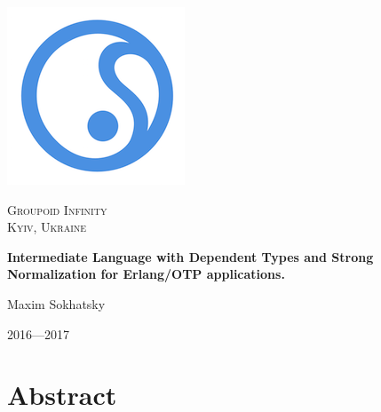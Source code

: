 \documentclass[11pt,oneside]{article}
\begin{document}
\thispagestyle{empty}
\begin{center}

\begin{minipage}[t]{2cm}
    \includegraphics[scale=0.4]{img/S}
\end{minipage}
\begin{minipage}[t]{12cm}
    \begin{flushright}
        \textsc{{\Large Groupoid Infinity}}\\
        \textsc{Kyiv, Ukraine}\\
    \end{flushright}
\end{minipage}

\vspace{3cm}
\vspace{3cm}   {\Large \bf Intermediate Language with Dependent Types and Strong Normalization for Erlang/OTP applications.\\}\par
\vspace{0.3cm} {\Large Maxim Sokhatsky\par}
\vspace{4cm}   {\Large 2016---2017}

\end{center}

\newpage
\vspace{2cm}
\tableofcontents

\newpage
\section{Abstract}
\end{document}
